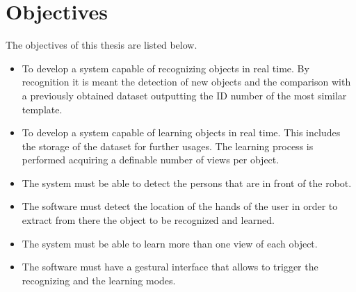 \section{Objectives}

The objectives of this thesis are listed below. 

\begin{itemize}
	\item To develop a system capable of recognizing objects in real time. 
			By recognition it is meant the detection of new objects and the comparison with a previously obtained dataset outputting the ID number of the most similar template.
	\item To develop a system capable of learning objects in real time. 
			This includes the storage of the dataset for further usages.
			The learning process is performed acquiring a definable number of views per object. 
	\item The system must be able to detect the persons that are in front of the robot. 
	\item The software must detect the location of the hands of the user in order to extract from there the object to be recognized and learned. 
	\item The system must be able to learn more than one view of each object. 
	\item The software must have a gestural interface that allows to trigger the recognizing and the learning modes. 

\end{itemize}
\\



